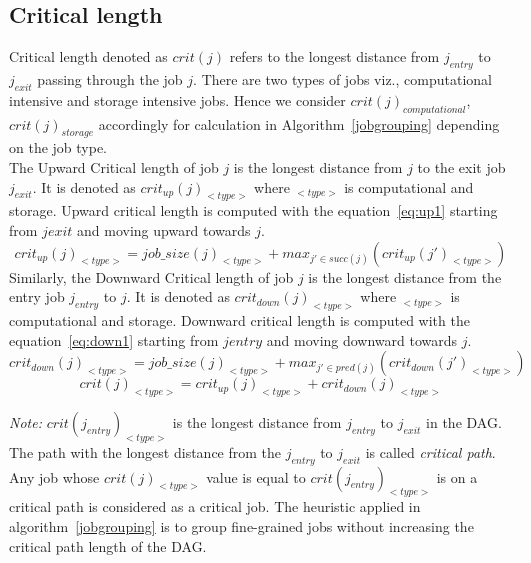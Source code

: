 \subsection{Critical length }
Critical length denoted as $crit(j)$ refers to the longest distance from $j_{entry}$ to $j_{exit}$ passing through the job $j$. There are two types of jobs viz., computational intensive and storage intensive jobs. Hence we consider $crit(j)_{computational}$, $crit(j)_{storage}$ accordingly for calculation in Algorithm~\ref{jobgrouping} depending on the job type.\\
The Upward Critical length of job $j$ is the longest distance from $j$ to the exit job $j_{exit}$. It is denoted as $crit_{up}(j)_{<type>}$ where $_{<type>}$ is computational and storage. Upward critical length is computed with the equation~\ref{eq:up1} starting from $j{exit}$ and moving upward towards $j$.
\begin{equation}\label{eq:up1}
crit_{up}(j)_{<type>} = job\_size(j)_{<type>} + max_{j' \in succ(j)}(crit_{up}(j')_{<type>})
\end{equation}
Similarly, the Downward Critical length of job $j$ is the longest distance from the entry job $j_{entry}$ to $j$. It is denoted as $crit_{down}(j)_{<type>}$ where $_{<type>}$ is computational and storage. Downward critical length is computed with the equation~\ref{eq:down1} starting from $j{entry}$ and moving downward towards $j$.
\begin{equation}\label{eq:down1}
crit_{down}(j)_{<type>} = job\_size(j)_{<type>} + max_{j' \in pred(j)}(crit_{down}(j')_{<type>}) 
\end{equation}
\begin{equation}\label{eq:cr}
crit(j)_{<type>} = crit_{up}(j)_{<type>} + crit_{down}(j)_{<type>}
\end{equation}
\begin{framed}
{\small \emph{Note:} $crit(j_{entry})_{<type>}$ is the longest distance from $j_{entry}$ to $j_{exit}$ in the DAG. The path with the longest distance from the $j_{entry}$ to $j_{exit}$ is called \emph{critical path}. Any job whose $crit(j)_{<type>}$ value is equal to $crit(j_{entry})_{<type>}$ is on a critical path is considered as a critical job. The heuristic applied in algorithm~\ref{jobgrouping} is to group fine-grained jobs without increasing the critical path length of the DAG.}
\end{framed}

